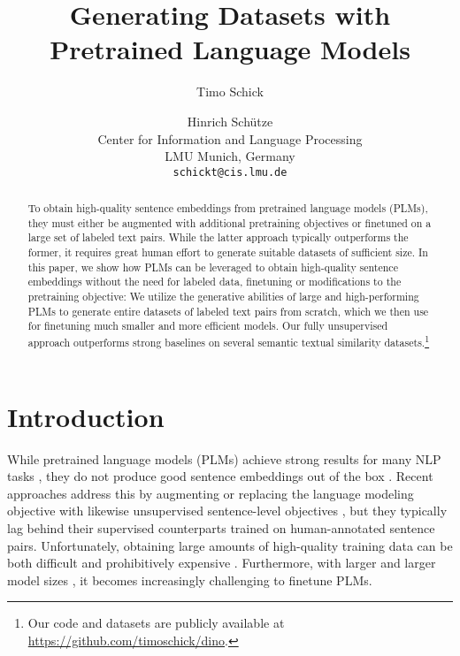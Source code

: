 \documentclass[11pt]{article}
\title{Generating Datasets with Pretrained Language Models}
\author{
	Timo Schick \and Hinrich Sch\"utze \\
	Center for Information and Language Processing \\ LMU Munich, Germany \\
	{\tt schickt@cis.lmu.de}
}
\begin{document}
	\maketitle
	\begin{abstract}
		To obtain high-quality sentence embeddings
	from pretrained language models (PLMs), they must either be
	augmented with additional pretraining objectives or
	finetuned on a large set of labeled text pairs. While the latter approach typically outperforms the former, it requires great human effort to generate suitable datasets of sufficient size.
		In this paper, we show how
PLMs can be leveraged to obtain high-quality
	sentence embeddings without the need for labeled data, finetuning or modifications to the
pretraining objective: We utilize the generative abilities
of large and high-performing PLMs to generate entire
	datasets of labeled text pairs from scratch, which
	we then use for finetuning much smaller and more
	efficient models. Our fully unsupervised approach
	outperforms strong  baselines on several semantic
	textual similarity datasets.\footnote{Our
	code and datasets are publicly available at \url{https://github.com/timoschick/dino}.}
	\end{abstract}

\section{Introduction}

While pretrained language models (PLMs) achieve strong results for many NLP tasks
\citep{peters2018deep,radford2018improving,devlin2018bert},
they do not produce good sentence embeddings out of the
box \citep{reimers-gurevych-2019-sentence}. Recent
approaches address this by augmenting or replacing the
language modeling objective with likewise unsupervised
sentence-level
objectives \citep[e.g.,][]{zhang-etal-2020-unsupervised,li-etal-2020-sentence},
but they typically lag behind their supervised counterparts
trained on human-annotated sentence pairs. Unfortunately,
obtaining large amounts of high-quality training data can be
both difficult and prohibitively
expensive \citep{bowman-etal-2015-large,agirre-etal-2016-semeval}. Furthermore,
with larger and larger model sizes \citep{radford2018language,raffel2019exploring,brown2020language,fedus2021switch}, it becomes increasingly challenging to finetune PLMs.
\end{document}
